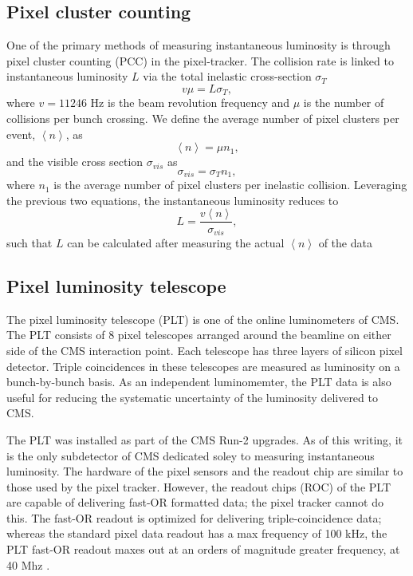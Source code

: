 \subsection{Pixel cluster counting}

One of the primary methods of measuring instantaneous luminosity is through pixel cluster counting (PCC) in the pixel-tracker. The collision rate is linked to instantaneous luminosity $L$ via the total inelastic cross-section $\sigma_T$
\begin{equation}
v \mu  = L \sigma_T,
\end{equation}
where $v=11246$ Hz is the beam revolution frequency and $\mu$ is the number of collisions per bunch crossing. We define the average number of pixel clusters per event, $\left \langle n \right \rangle$, as
\begin{equation}
\left \langle n \right \rangle = \mu n_1,
\end{equation}
and the visible cross section $\sigma_{vis}$ as 
\begin{equation}
\sigma_{vis} = \sigma_T n_1,
\end{equation}
where $n_1$ is the average number of pixel clusters per inelastic collision. Leveraging the previous two equations, the instantaneous luminosity reduces to
\begin{equation}
L = \frac{v\left \langle n \right \rangle}{\sigma_{vis}},
\end{equation}
such that $L$ can be calculated after measuring the actual $\left \langle n \right \rangle$ of the data \cite{CMS:2013gfa}

\subsection{Pixel luminosity telescope}

The pixel luminosity telescope (PLT) is one of the online luminometers of CMS. The PLT consists of 8 pixel telescopes arranged around the beamline on either side of the CMS interaction point. Each telescope has three layers of silicon pixel detector. Triple coincidences in these telescopes are measured as luminosity on a bunch-by-bunch basis. As an independent luminomemter, the PLT data is also useful for reducing the systematic uncertainty of the luminosity delivered to CMS. 

The PLT was installed as part of the CMS Run-2 upgrades. As of this writing, it is the only subdetector of CMS dedicated soley to measuring instantaneous luminosity. The hardware of the pixel sensors and the readout chip are similar to those used by the pixel tracker. However, the readout chips (ROC) of the PLT are capable of delivering fast-OR formatted data; the pixel tracker cannot do this. The fast-OR readout is optimized for delivering triple-coincidence data; whereas the standard pixel data readout has a max frequency of 100 kHz, the PLT fast-OR readout maxes out at an orders of magnitude greater frequency, at 40 Mhz \cite{Kornmayer:2016wkz}.


